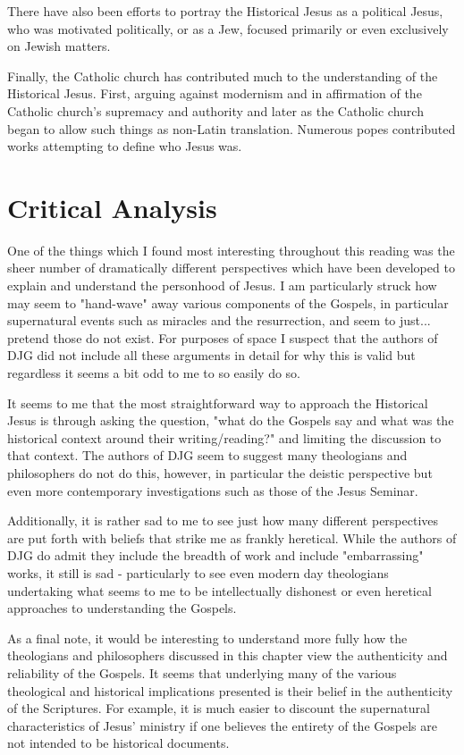 \documentclass[12pt]{turabian-researchpaper}
\begin{document}
There have also been efforts to portray the Historical Jesus as a political Jesus, who was motivated politically, or as a Jew, focused primarily or even exclusively on Jewish matters.

Finally, the Catholic church has contributed much to the understanding of the Historical Jesus. First, arguing against modernism and in affirmation of the Catholic church's supremacy and authority and later as the Catholic church began to allow such things as non-Latin translation. Numerous popes contributed works attempting to define who Jesus was.


\section{Critical Analysis}

One of the things which I found most interesting throughout this reading was the sheer number of dramatically different perspectives which have been developed to explain and understand the personhood of Jesus. I am particularly struck how may seem to "hand-wave" away various components of the Gospels, in particular supernatural events such as miracles and the resurrection, and seem to just... pretend those do not exist. For purposes of space I suspect that the authors of DJG did not include all these arguments in detail for why this is valid but regardless it seems a bit odd to me to so easily do so.

It seems to me that the most straightforward way to approach the Historical Jesus is through asking the question, "what do the Gospels say and what was the historical context around their writing/reading?" and limiting the discussion to that context.  The authors of DJG seem to suggest many theologians and philosophers do not do this, however, in particular the deistic perspective but even more contemporary investigations such as those of the Jesus Seminar.

Additionally, it is rather sad to me to see just how many different perspectives are put forth with beliefs that strike me as frankly heretical. While the authors of DJG do admit they include the breadth of work and include "embarrassing" works, it still is sad - particularly to see even modern day theologians undertaking what seems to me to be intellectually dishonest or even heretical approaches to understanding the Gospels.

As a final note, it would be interesting to understand more fully how the theologians and philosophers discussed in this chapter view the authenticity and reliability of the Gospels. It seems that underlying many of the various theological and historical implications presented is their belief in the authenticity of the Scriptures. For example, it is much easier to discount the supernatural characteristics of Jesus' ministry if one believes the entirety of the Gospels are not intended to be historical documents. 

\newpage
\printbibliography
\end{document}
